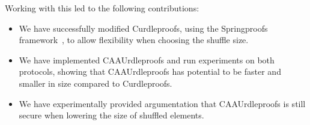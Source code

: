 Working with this led to the following contributions:
\begin{itemize}
    \item We have successfully modified Curdleproofs, using the Springproofs framework~\cite{zhang2024springproofs}, to allow flexibility when choosing the shuffle size.
    \item We have implemented CAAUrdleproofs and run experiments on both protocols, showing that CAAUrdleproofs has potential to be faster and smaller in size compared to Curdleproofs.
    \item We have experimentally provided argumentation that CAAUrdleproofs is still secure when lowering the size of shuffled elements.
\end{itemize}


